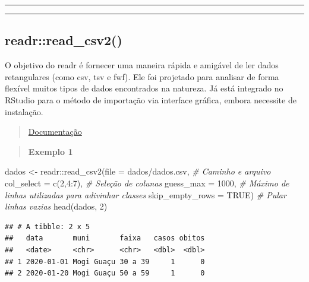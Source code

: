 \documentclass[
]{book}
\newenvironment{Shaded}{\begin{snugshade}}{\end{snugshade}}
\newcommand{\AttributeTok}[1]{\textcolor[rgb]{0.77,0.63,0.00}{#1}}
\newcommand{\CommentTok}[1]{\textcolor[rgb]{0.56,0.35,0.01}{\textit{#1}}}
\newcommand{\ConstantTok}[1]{\textcolor[rgb]{0.00,0.00,0.00}{#1}}
\newcommand{\DecValTok}[1]{\textcolor[rgb]{0.00,0.00,0.81}{#1}}
\newcommand{\FunctionTok}[1]{\textcolor[rgb]{0.00,0.00,0.00}{#1}}
\newcommand{\NormalTok}[1]{#1}
\newcommand{\OtherTok}[1]{\textcolor[rgb]{0.56,0.35,0.01}{#1}}
\newcommand{\SpecialCharTok}[1]{\textcolor[rgb]{0.00,0.00,0.00}{#1}}
\newcommand{\StringTok}[1]{\textcolor[rgb]{0.31,0.60,0.02}{#1}}
\theoremstyle{definition}
\theoremstyle{definition}
\theoremstyle{definition}
\theoremstyle{definition}
\theoremstyle{remark}
\begin{document}
\begin{center}\rule{0.5\linewidth}{0.5pt}\end{center}

\begin{center}\rule{0.5\linewidth}{0.5pt}\end{center}

\hypertarget{readrread_csv2}{%
\subsection{readr::read\_csv2()}\label{readrread_csv2}}

O objetivo do readr é fornecer uma maneira rápida e amigável de ler dados retangulares (como csv, tsv e fwf). Ele foi projetado para analisar de forma flexível muitos tipos de dados encontrados na natureza. Já está integrado no RStudio para o método de importação via interface gráfica, embora necessite de instalação.

\begin{quote}
\href{https://www.rdocumentation.org/packages/readr/versions/1.3.1}{Documentação}
\end{quote}

\begin{quote}
\textbf{Exemplo 1}
\end{quote}

\begin{Shaded}
\begin{Highlighting}[]
\NormalTok{dados }\OtherTok{\textless{}{-}}\NormalTok{ readr}\SpecialCharTok{::}\FunctionTok{read\_csv2}\NormalTok{(}\AttributeTok{file =} \StringTok{\textquotesingle{}dados/dados.csv\textquotesingle{}}\NormalTok{,  }\CommentTok{\# Caminho e arquivo}
                          \AttributeTok{col\_select =} \FunctionTok{c}\NormalTok{(}\DecValTok{2}\NormalTok{,}\DecValTok{4}\SpecialCharTok{:}\DecValTok{7}\NormalTok{),     }\CommentTok{\# Seleção de colunas}
                          \AttributeTok{guess\_max =} \DecValTok{1000}\NormalTok{,          }\CommentTok{\# Máximo de linhas utilizadas para adivinhar classes}
                          \AttributeTok{skip\_empty\_rows =} \ConstantTok{TRUE}\NormalTok{)    }\CommentTok{\# Pular linhas vazias}
\FunctionTok{head}\NormalTok{(dados, }\DecValTok{2}\NormalTok{)                                       }
\end{Highlighting}
\end{Shaded}

\begin{verbatim}
## # A tibble: 2 x 5
##   data       muni       faixa   casos obitos
##   <date>     <chr>      <chr>   <dbl>  <dbl>
## 1 2020-01-01 Mogi Guaçu 30 a 39     1      0
## 2 2020-01-20 Mogi Guaçu 50 a 59     1      0
\end{verbatim}
\end{document}
